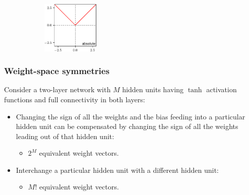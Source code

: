 \documentclass{beamer}
\begin{document}
\begin{frame}
\begin{figure}
\begin{subfigure}{0.8\textwidth}
            \includegraphics[width=0.3\textwidth]{Figure_12_f.pdf}
        \end{subfigure}
    \end{figure}
\end{frame}

\begin{frame}
    \frametitle{Weight-space symmetries}
    Consider a two-layer network with $M$ hidden units having $\tanh$ activation functions and full connectivity in both layers:
    \begin{itemize}
        \item Changing the sign of all the weights and the bias feeding into a particular hidden unit can be compensated by changing the sign of all the weights leading out of that hidden unit:
        \begin{itemize}
            \item $2^{M}$ equivalent weight vectors.
        \end{itemize}
        \item Interchange a particular hidden unit with a different hidden unit:
        \begin{itemize}
            \item $M!$ equivalent weight vectors.
        \end{itemize}
    \end{itemize}
\end{frame}
\end{document}
